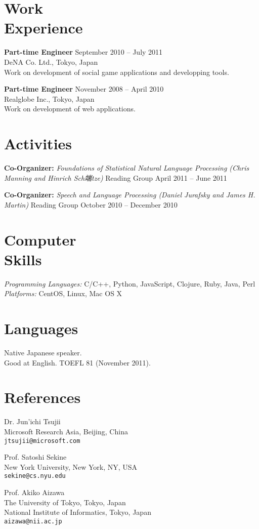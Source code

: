 \documentclass[margin]{res}
\begin{document}
\begin{resume}
\section{Work \\ Experience}
\textbf{Part-time Engineer} \hfill September 2010 -- July 2011\\
DeNA Co. Ltd., Tokyo, Japan\\
Work on development of social game applications and developping tools.

\textbf{Part-time Engineer} \hfill November 2008 -- April 2010\\
Realglobe Inc., Tokyo, Japan\\
Work on development of web applications.\\

\section{Activities}
\textbf{Co-Organizer:} {\sl Foundations of Statistical Natural Language Processing (Chris Manning and Hinrich Sch端tze)} Reading Group \hfill April 2011 -- June 2011

\textbf{Co-Organizer:} {\sl Speech and Language Processing (Daniel Jurafsky and James H. Martin)} Reading Group \hfill October 2010 -- December 2010\\


\section{Computer \\ Skills}
\textit{Programming Languages:} C/C++, Python, JavaScript, Clojure, Ruby, Java, Perl \\
\textit{Platforms:} CentOS, Linux, Mac OS X\\

\section{Languages}
Native Japanese speaker.\\
Good at English. TOEFL 81 (November 2011). \\

\section{References} 
Dr. Jun'ichi Tsujii \\
Microsoft Research Asia, Beijing, China\\
{\tt jtsujii@microsoft.com}

Prof. Satoshi Sekine \\
New York University, New York, NY, USA\\
{\tt sekine@cs.nyu.edu}

Prof. Akiko Aizawa \\
The University of Tokyo, Tokyo, Japan\\
National Institute of Informatics, Tokyo, Japan\\
{\tt aizawa@nii.ac.jp}

\end{resume}
\end{document}
